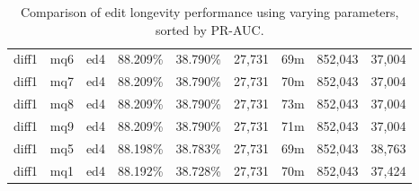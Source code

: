 \begin{sidewaystable}[!tp]
\begin{center}
\begin{tabular}{|c|c|c||c|c||c|c|c|c|}
diff1 & mq6 & ed4 & 88.209\% & 38.790\% & 27,731 & 69m & 852,043 & 37,004 \\
diff1 & mq7 & ed4 & 88.209\% & 38.790\% & 27,731 & 70m & 852,043 & 37,004 \\
diff1 & mq8 & ed4 & 88.209\% & 38.790\% & 27,731 & 73m & 852,043 & 37,004 \\
diff1 & mq9 & ed4 & 88.209\% & 38.790\% & 27,731 & 71m & 852,043 & 37,004 \\
diff1 & mq5 & ed4 & 88.198\% & 38.783\% & 27,731 & 69m & 852,043 & 38,763 \\
diff1 & mq1 & ed4 & 88.192\% & 38.728\% & 27,731 & 70m & 852,043 & 37,424 \\
\hline
\end{tabular}
\end{center}
\caption{Comparison of edit longevity performance using
    varying parameters, sorted by PR-AUC.}
\label{tab:editshout}
\end{sidewaystable}

